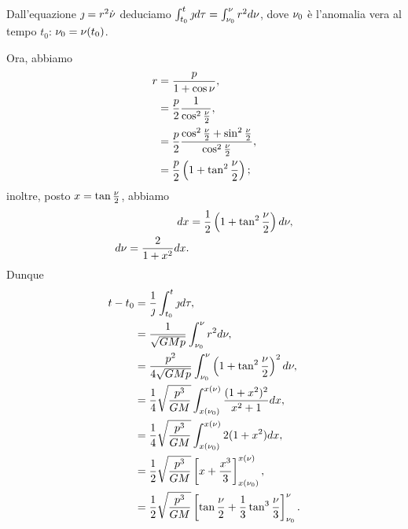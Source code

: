 \Proof Dall'equazione
$\jmath = r^2 \dot{\nu}$
deduciamo
$\int_{t_0}^t \jmath d\tau
= \int_{\nu_0}^\nu r^2 d\nu$,
dove $\nu_0$ \`e l'anomalia vera al tempo $t_0$:
$\nu_0 = \nu(t_0)$.
\par Ora, abbiamo
\begin{align*}
  r
  &= \frac{p}{1 + \cos \nu},\\
  &= \frac{p}{2}
      \frac{1}{\cos^2 \frac{\nu}{2}},\\
  &= \frac{p}{2}
      \frac{\cos^2\frac{\nu}{2} + \sin^2\frac{\nu}{2}}
        {\cos^2 \frac{\nu}{2}},\\
  &= \frac{p}{2}
      \left ( 1 + \tan^2 \frac{\nu}{2} \right );
\end{align*}
inoltre, posto $x = \tan \frac{\nu}{2}$, abbiamo
\begin{align*}
  dx
    &= \frac{1}{2}
      \left (1 + \tan^2\frac{\nu}{2} \right ) d\nu,\\
  d\nu = \frac{2}{1 + x^2} dx.
\end{align*}
Dunque
\begin{align*}
t - t_0
&= \frac{1}{\jmath}
    \int_{t_0}^t \jmath d\tau,\\
&= \frac{1}{\sqrt{GMp}}
    \int_{\nu_0}^\nu r^2 d\nu,\\
&= \frac{p^2}
    {4\sqrt{GMp}}
    \int_{\nu_0}^\nu
    \left (
    1 + \tan^2 \frac{\nu}{2}
    \right )^2
    d\nu,\\
&= \frac{1}{4}
    \sqrt{\frac{p^3}{GM}}
    \int_{x(\nu_0)}^{x(\nu)}
    \frac{(1 + x^2)^2}
    {x^2 + 1}
    dx,\\
&= \frac{1}{4}
    \sqrt{\frac{p^3}{GM}}
    \int_{x(\nu_0)}^{x(\nu)}
    2 (1 + x^2)
    dx,\\
&= \frac{1}{2}
    \sqrt{\frac{p^3}{GM}}
    \left [
    x + \frac{x^3}{3}
    \right ]_{x(\nu_0)}^{x(\nu)},\\
&= \frac{1}{2}
    \sqrt{\frac{p^3}{GM}}
    \left [
    \tan \frac{\nu}{2}
    + \frac{1}{3} \tan^3 \frac{\nu}{3}
    \right ]_{\nu_0}^{\nu}.
\end{align*}
